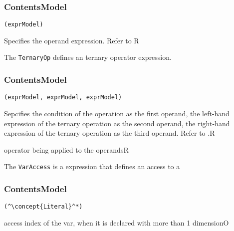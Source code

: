 \subsubsection*{ContentsModel}{}

\begin{lstlisting}[style=default,frame=none]
(exprModel)
\end{lstlisting}

\begin{HIRChildElements}
	{Specifies the operand expression. Refer to }{R}
\end{HIRChildElements}


The {\tt TernaryOp} defines an ternary operator expression.

\subsubsection*{ContentsModel}{}

\begin{lstlisting}[style=default,frame=none]
(exprModel, exprModel, exprModel)
\end{lstlisting}

\begin{HIRChildElements}
	{Sepcifies the condition of the operation as the first operand, the 
	 left-hand expression of the ternary operation as the second 
	 operand, the right-hand expression of the ternary operation as the third 
	 operand. Refer to .}{R}
\end{HIRChildElements}

\begin{HIRAttributes}
	{operator being applied to the operands}{R}
\end{HIRAttributes}


The {\tt VarAccess} is a expression that defines an access to a 

\subsubsection*{ContentsModel}{}

\begin{lstlisting}[style=default,frame=none]
(^\concept{Literal}^*)
\end{lstlisting}

\begin{HIRChildElements}
	{access index of the var, when it is declared with more than 1 dimension}{O}
\end{HIRChildElements}

